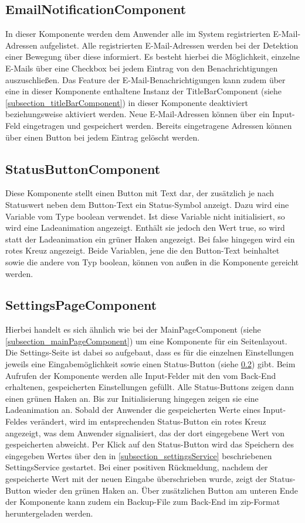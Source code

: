 \subsection{EmailNotificationComponent}
\label{subsection_emailNotificationComponent}
In dieser Komponente werden dem Anwender alle im System registrierten E-Mail-Adressen aufgelistet. Alle registrierten E-Mail-Adressen werden bei der Detektion einer Bewegung über diese informiert. Es besteht hierbei die Möglichkeit, einzelne E-Mails über eine Checkbox bei jedem Eintrag von den Benachrichtigungen auszuschließen. Das Feature der E-Mail-Benachrichtigungen kann zudem über eine in dieser Komponente enthaltene Instanz der TitleBarComponent (siehe \ref{subsection_titleBarComponent}) in dieser Komponente deaktiviert beziehungsweise aktiviert werden.
Neue E-Mail-Adressen können über ein Input-Feld eingetragen und gespeichert werden. Bereits eingetragene Adressen können über einen Button bei jedem Eintrag gelöscht werden.

\subsection{StatusButtonComponent}
\label{subsection_statusButtonComponent}
Diese Komponente stellt einen Button mit Text dar, der zusätzlich je nach Statuswert neben dem Button-Text ein Status-Symbol anzeigt. Dazu wird eine Variable vom Type boolean verwendet. Ist diese Variable nicht initialisiert, so wird eine Ladeanimation angezeigt. Enthält sie jedoch den Wert true, so wird statt der Ladeanimation ein grüner Haken angezeigt. Bei false hingegen wird ein rotes Kreuz angezeigt. Beide Variablen, jene die den Button-Text beinhaltet sowie die andere von Typ boolean, können von außen in die Komponente gereicht werden.

\subsection{SettingsPageComponent}
Hierbei handelt es sich ähnlich wie bei der MainPageComponent (siehe \ref{subsection_mainPageComponent}) um eine Komponente für ein Seitenlayout. Die Settings-Seite ist dabei so aufgebaut, dass es für die einzelnen Einstellungen jeweils eine Eingabemöglichkeit sowie einen Status-Button (siehe \ref{subsection_statusButtonComponent}) gibt. Beim Aufrufen der Komponente werden alle Input-Felder mit den vom Back-End erhaltenen, gespeicherten Einstellungen gefüllt. Alle Status-Buttons zeigen dann einen grünen Haken an. Bis zur Initialisierung hingegen zeigen sie eine Ladeanimation an. Sobald der Anwender die gespeicherten Werte eines Input-Feldes verändert, wird im entsprechenden Status-Button ein rotes Kreuz angezeigt, was dem Anwender signalisiert, das der dort eingegebene Wert von gespeicherten abweicht. Per Klick auf den Status-Button wird das Speichern des eingegeben Wertes über den in \ref{subsection_settingsService} beschriebenen SettingsService gestartet. Bei einer positiven Rückmeldung, nachdem der gespeicherte Wert mit der neuen Eingabe überschrieben wurde, zeigt der Status-Button wieder den grünen Haken an. Über zusätzlichen Button am unteren Ende der Komponente kann zudem ein Backup-File zum Back-End im zip-Format heruntergeladen werden.

